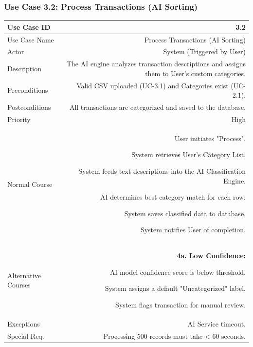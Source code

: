 \newpage

\subsubsection{Use Case 3.2: Process Transactions (AI Sorting)}
\begin{tabularx}{\textwidth}{|L|R|}
	\hline
	Use Case ID & 3.2 \\ \hline
	Use Case Name & Process Transactions (AI Sorting) \\ \hline
	Actor & System (Triggered by User) \\ \hline
	Description & The AI engine analyzes transaction descriptions and assigns them to User's custom categories. \\ \hline
	Preconditions & Valid CSV uploaded (UC-3.1) and Categories exist (UC-2.1). \\ \hline
	Postconditions & All transactions are categorized and saved to the database. \\ \hline
	Priority & High \\ \hline
	Normal Course & 
	\begin{normalsteps}
		\item User initiates "Process".
		\item System retrieves User's Category List.
		\item System feeds text descriptions into the AI Classification Engine.
		\item AI determines best category match for each row.
		\item System saves classified data to database.
		\item System notifies User of completion.
	\end{normalsteps} \\ \hline
	Alternative Courses & 
	\textbf{4a. Low Confidence:} 
	\begin{altsteps}
		\item AI model confidence score is below threshold.
		\item System assigns a default "Uncategorized" label.
		\item System flags transaction for manual review.
	\end{altsteps} \\ \hline
	Exceptions & AI Service timeout. \\ \hline
	Special Req. & Processing 500 records must take < 60 seconds. \\ \hline
\end{tabularx}

